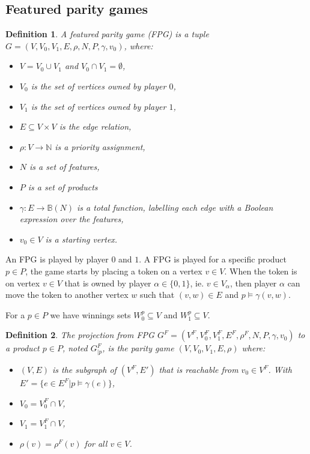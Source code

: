 \documentclass[]{article}
\newtheorem{definition}{Definition}[section]
\begin{document}
\subsection{Featured parity games}
\begin{definition}
	A featured parity game (FPG) is a tuple $G = (V,V_0, V_1, E, \rho, N, P, \gamma, v_0)$, where:
	\begin{itemize}
		\item $V = V_0 \cup V_1$ and $V_0 \cap V_1 = \emptyset$,
		\item $V_0$ is the set of vertices owned by player $0$,
		\item $V_1$ is the set of vertices owned by player $1$, 
		\item $E \subseteq V \times V$ is the edge relation,
		\item $\rho :  V \rightarrow \mathbb{N}$ is a priority assignment,
		\item $N$ is a set of features,
		\item $P$ is a set of products
		\item $\gamma : E \rightarrow \mathbb{B}(N)$ is a total function, labelling each edge with a Boolean expression over the features,
		\item $v_0 \in V$ is a starting vertex.
	\end{itemize}
\end{definition}
An FPG is played by player $0$ and $1$. A FPG is played for a specific product $p \in P$, the game starts by placing a token on a vertex $v \in V$. When the token is on vertex $v \in V$ that is owned by player $\alpha \in \{0,1\}$, ie. $v \in V_\alpha$, then player $\alpha$ can move the token to another vertex $w$ such that $(v,w) \in E$ and $p \models \gamma(v,w)$.

For a $p \in P$ we have winnings sets $W_0^p \subseteq V$ and $W_1^p \subseteq V$.
\begin{definition}
The projection from FPG $G^F = (V^F,V_0^F, V_1^F, E^F, \rho^F, N, P, \gamma, v_0)$ to a product $p \in P$, noted $G^F_{|p}$, is the parity game $(V,V_0,V_1, E, \rho)$ where:
\begin{itemize}	
	\item $(V,E)$ is the subgraph of $(V^F,E')$ that is reachable from $v_0 \in V^F$. With $E' = \{ e \in E^F| p \models \gamma(e) \}$,
	\item $V_0 = V_0^F \cap V$,
	\item $V_1 = V_1^F \cap V$,
	\item $\rho(v) = \rho^F(v)$ for all $v \in V$.
\end{itemize}
\end{definition}
\end{document}
